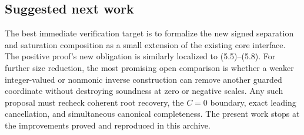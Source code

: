 \subsection{Suggested next work}

The best immediate verification target is to formalize the
new signed separation and saturation composition as a small
extension of the existing core interface. The positive proof's
new obligation is similarly localized to (5.5)--(5.8).
For further size reduction, the most promising open comparison
is whether a weaker integer-valued or nonmonic inverse
construction can remove another guarded coordinate without
destroying soundness at zero or negative scales.
Any such proposal must recheck coherent root recovery,
the \(C=0\) boundary, exact leading cancellation, and simultaneous
canonical completeness. The present work stops at the improvements
proved and reproduced in this archive.

